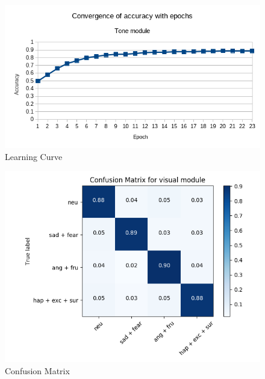 \documentclass[oneside,a4paper,12pt]{report}
\begin{document}
\begin{normalsize}
\begin{itemize}
				\begin{center}
				\begin{figure}[!htbp]
					\centering
					\includegraphics[width=\textwidth]{tone-convergence-dnn.png}
					\caption{Learning Curve}
					\label{fig:learning-curve}
				\end{figure}
			\end{center}

		\begin{center}
			\begin{figure}[!htbp]
				\centering
				\includegraphics[width=\textwidth]{tone-confusion-matrix.png}
				\caption{Confusion Matrix}
				\label{fig:confusion_matrix}
			\end{figure}
		\end{center} 
	

\end{itemize}
\end{normalsize}
\end{document}

